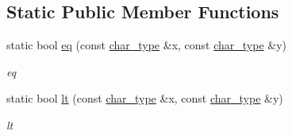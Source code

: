 \subsection*{Static Public Member Functions}
\begin{DoxyCompactItemize}
\item 
static bool \hyperlink{class_interface_trans_a8db2041057e08e815cabb5d1be83417e}{eq} (const \hyperlink{class_interface_trans_a4c87e8d04c2749f9e2b619333cdc6245}{char\+\_\+type} \&x, const \hyperlink{class_interface_trans_a4c87e8d04c2749f9e2b619333cdc6245}{char\+\_\+type} \&y)
\begin{DoxyCompactList}\small\item\em eq \end{DoxyCompactList}\item 
static bool \hyperlink{class_interface_trans_a633c8fc0064aecb912e6a779aebe1004}{lt} (const \hyperlink{class_interface_trans_a4c87e8d04c2749f9e2b619333cdc6245}{char\+\_\+type} \&x, const \hyperlink{class_interface_trans_a4c87e8d04c2749f9e2b619333cdc6245}{char\+\_\+type} \&y)
\begin{DoxyCompactList}\small\item\em lt \end{DoxyCompactList}\end{DoxyCompactItemize}
